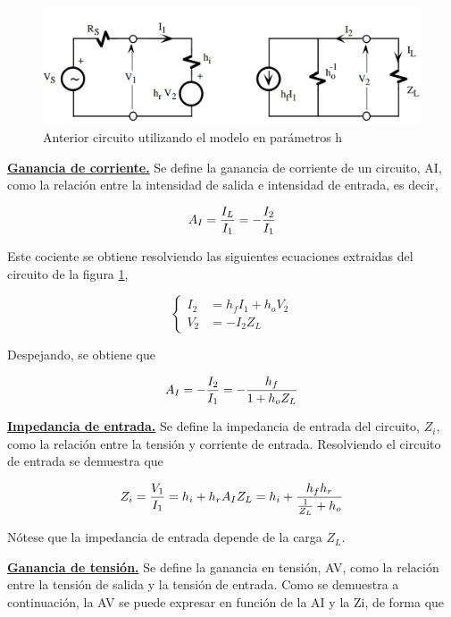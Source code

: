 \documentclass[12pt, a4paper]{article}
\begin{document}
    \begin{figure}[h!]
        \centering
        \includegraphics[height=4cm\textwidth]{amp-bas-h.jpg}
        \caption{Anterior circuito utilizando el modelo en parámetros h}
        \label{fig:amp-bas-h}
    \end{figure}

    \underline{\bf Ganancia de corriente.} Se define la ganancia de corriente de un circuito, AI, como la relación entre la intensidad de salida e intensidad de entrada, es decir,

    $$A_I = {I_L \over I_1} = -{I_2 \over I_1}$$

    Este cociente se obtiene resolviendo las siguientes ecuaciones extraidas del circuito de la figura \ref{fig:amp-bas-h},

    \begin{equation*} %
        \left\{ \begin{split}
            I_2 & = h_fI_1 + h_oV_2 \\
            V_2 & = -I_2Z_L 
        \end{split} \right.
    \end{equation*}

    Despejando, se obtiene que

    $$A_I = -{I_2 \over I_1} = -\frac{h_f}{1 + h_oZ_L}$$

    \underline{\bf Impedancia de entrada.} Se define la impedancia de entrada del circuito, $Z_i$, como la relación entre la tensión y corriente de entrada. Resolviendo el circuito de entrada se demuestra que

    $$Z_i = {V_1 \over I_1} = h_i + h_rA_IZ_L = h_i + \frac{h_fh_r}{{1 \over Z_L} + h_o}$$

    Nótese que la impedancia de entrada depende de la carga $Z_L$.

    \underline{\bf Ganancia de tensión.}  Se define la ganancia en tensión, AV, como la relación entre la tensión de salida y la tensión de entrada. Como se demuestra a continuación, la AV se puede expresar en función de la AI y la Zi, de forma que
\end{document}
